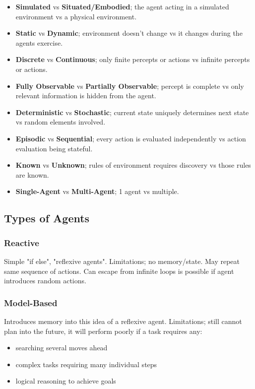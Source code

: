 \documentclass{article}
\begin{document}
\begin{itemize}
	\item \textbf{Simulated} vs \textbf{Situated/Embodied}; the agent acting in a simulated environment vs a physical environment.
	\item \textbf{Static} vs \textbf{Dynamic}; environment doesn't change vs it changes during the agents exercise.
	\item \textbf{Discrete} vs \textbf{Continuous}; only finite percepts or actions vs infinite percepts or actions.
	\item \textbf{Fully Observable} vs \textbf{Partially Observable}; percept is complete vs only relevant information is hidden from the agent.
	\item \textbf{Deterministic} vs \textbf{Stochastic}; current state uniquely determines next state vs random elements involved.
	\item \textbf{Episodic} vs \textbf{Sequential}; every action is evaluated independently vs action evaluation being stateful.
	\item \textbf{Known} vs \textbf{Unknown}; rules of environment requires discovery vs those rules are known.
	\item \textbf{Single-Agent} vs \textbf{Multi-Agent}; 1 agent vs multiple.
\end{itemize}

\subsection{Types of Agents}

\subsubsection{Reactive}
Simple "if else", "reflexive agents". Limitations; no memory/state. May repeat same sequence of actions. Can escape from infinite loops is possible if agent introduces random actions.

\subsubsection{Model-Based}
Introduces memory into this idea of a reflexive agent. Limitations; still cannot plan into the future, it will perform poorly if a task requires any:

\begin{itemize}
	\item searching several moves ahead
	\item complex tasks requiring many individual steps
	\item logical reasoning to achieve goals
\end{itemize}
\end{document}
